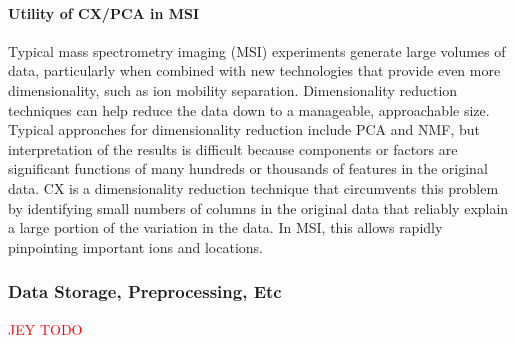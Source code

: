 \paragraph{Utility of CX/PCA in MSI}
Typical mass spectrometry imaging (MSI) experiments generate large volumes of data, particularly when combined with new
technologies that provide even more dimensionality, such as ion mobility separation.
Dimensionality reduction techniques can help reduce the data down to a manageable, approachable size.
Typical approaches for dimensionality reduction include PCA and NMF, but interpretation of the results is difficult
because components or factors are significant functions of many hundreds or thousands of features in the original data.
CX is a dimensionality reduction technique that circumvents this problem by identifying small numbers of columns in the
original data that reliably explain a large portion of the variation in the data.
In MSI, this allows rapidly pinpointing important ions and locations.

\subsubsection{Data Storage, Preprocessing, Etc}
\textcolor{red}{JEY TODO}
